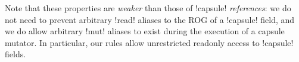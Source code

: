 
Note that these properties are \emph{weaker} than those of \Q!capsule! \emph{references}: we do not need to prevent arbitrary \Q!read! aliases to the ROG of a \Q!capsule! field, and we do allow arbitrary \Q!mut! aliases  to exist during the execution of a capsule mutator. In particular, our rules allow unrestricted readonly access to \Q!capsule! fields.






